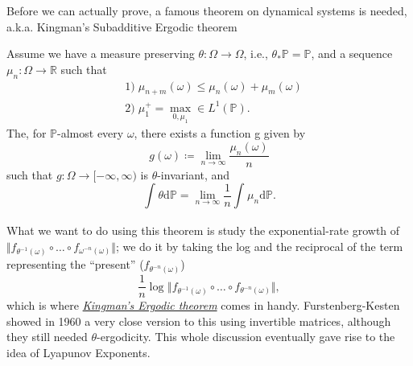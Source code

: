 \documentclass[../stationary_ifs.tex]{subfiles}
\begin{document}
Before we can actually prove, a famous theorem on dynamical systems is needed, a.k.a. Kingman's Subadditive Ergodic theorem
\hypertarget{kingman_ergodic}{
	\begin{theorem*}
		Assume we have a measure preserving \(\theta :\Omega \rightarrow \Omega \), i.e., \(\theta_{*}\mathbb{P} = \mathbb{P}\), and a sequence \(\mu_{n}:\Omega \rightarrow \mathbb{R}\) such that
		\begin{align*}
			 & 1)\; \mu_{n+m}(\omega ) \leq \mu_{n}(\omega ) + \mu_{m}(\omega )  \\
			 & 2)\; \mu_{1}^{+} = \max\limits_{0, \mu_{1}}\in L^{1}(\mathbb{P}).
		\end{align*}
		The, for \(\mathbb{P}\)-almost every \(\omega \), there exists a function g given by
		\[
			g(\omega )\coloneqq \lim_{n\to \infty}\frac{\mu_{n}(\omega )}{n}
		\]
		such that \(g:\Omega \rightarrow [-\infty, \infty)\) is \(\theta \)-invariant, and
		\[
			\int_{}^{}\theta  \mathrm{d}\mathbb{P} = \lim_{n\to \infty}\frac{1}{n}\int_{}^{}\mu_{n} \mathrm{d}\mathbb{P}.
		\]
	\end{theorem*}
}
What we want to do using this theorem is study the exponential-rate growth of \(\Vert f_{\theta^{-1}(\omega )}\circ \dotsc \circ f_{\omega^{-n}(\omega )} \Vert\); we do it by taking the log and the reciprocal
of the term representing the ``present'' (\(f_{\theta^{-n}(\omega )}\))
\[
	\frac{1}{n} \log^{}{\Vert f_{\theta^{-1}(\omega) } \circ \dotsc \circ f_{\theta^{-n}(\omega )}\Vert},
\]
which is where \hyperlink{kingman_ergodic}{\textit{Kingman's Ergodic theorem}} comes in handy. Furstenberg-Kesten showed in 1960 a very close version to this using invertible matrices, although they still
needed \(\theta \)-ergodicity. This whole discussion eventually gave rise to the idea of Lyapunov Exponents.
\end{document}
